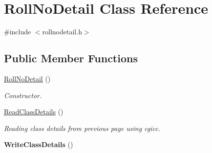 \hypertarget{classRollNoDetail}{\section{Roll\-No\-Detail Class Reference}
\label{classRollNoDetail}
}


{\ttfamily \#include $<$rollnodetail.\-h$>$}

\subsection*{Public Member Functions}
\begin{DoxyCompactItemize}
\item 
\hyperlink{classRollNoDetail_a35022484630c725f33e0d9f70ee678d7}{Roll\-No\-Detail} ()
\begin{DoxyCompactList}\small\item\em Constructor. \end{DoxyCompactList}\item 
\hyperlink{classRollNoDetail_a941f09a9307b97c7d3655e68815954c3}{Read\-Class\-Details} ()
\begin{DoxyCompactList}\small\item\em Reading class details from previous page using cgicc. \end{DoxyCompactList}\item 
\hypertarget{classRollNoDetail_adeb8b51063f8e325c36472b8ab98557a}{{\bfseries Write\-Class\-Details} ()}\label{classRollNoDetail_adeb8b51063f8e325c36472b8ab98557a}

\end{DoxyCompactItemize}
